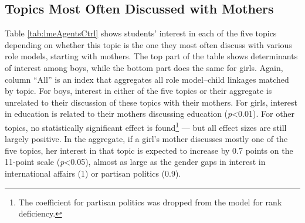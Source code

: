 \documentclass[
  letterpaper,
  DIV=11,
  numbers=noendperiod]{scrreprt}
\begin{document}
\subsection{Topics Most Often Discussed with
Mothers}\label{topics-most-often-discussed-with-mothers}

Table \ref{tab:lmeAgentsCtrl} shows students' interest in each of the
five topics depending on whether this topic is the one they most often
discuss with various role models, starting with mothers. The top part of
the table shows determinants of interest among boys, while the bottom
part does the same for girls. Again, column ``All'' is an index that
aggregates all role model--child linkages matched by topic. For boys,
interest in either of the five topics or their aggregate is unrelated to
their discussion of these topics with their mothers. For girls, interest
in education is related to their mothers discussing education
(\emph{p}\textless0.01). For other topics, no statistically significant
effect is found\footnote{The coefficient for partisan politics was
  dropped from the model for rank deficiency.} --- but all effect sizes
are still largely positive. In the aggregate, if a girl's mother
discusses mostly one of the five topics, her interest in that topic is
expected to increase by 0.7 points on the 11-point scale
(\emph{p}\textless0.05), almost as large as the gender gaps in interest
in international affairs (1) or partisan politics (0.9).
\end{document}
